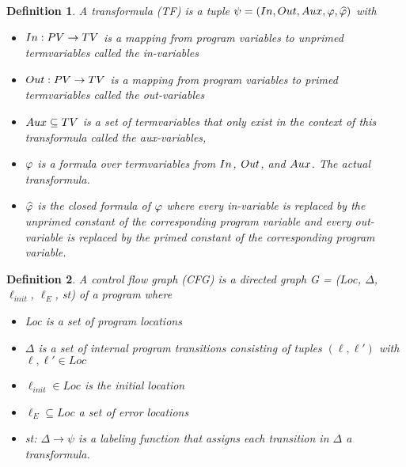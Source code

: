 \documentclass{article}
\newtheorem{mydef}{Definition}
\begin{document}
    \begin{mydef}
        A transformula (TF) is a tuple $\psi = (In, Out, Aux, \varphi, \widehat{\varphi})$ with 
        \begin{itemize}
          \item $In : PV \rightarrow TV$ is a mapping from program variables to unprimed termvariables called the in-variables
          \item $Out : PV \rightarrow TV$ is a mapping from program variables to primed termvariables called the out-variables
          \item $Aux \subseteq TV$ is a set of termvariables that only exist in the context of this transformula called the aux-variables,
          \item $\varphi$ is a formula over termvariables from $In$, $Out$, and $Aux$. The actual transformula.
          \item $\widehat{\varphi}$ is the closed formula of $\varphi$ where every in-variable is replaced by the unprimed constant of the corresponding program variable and every out-variable is replaced by the primed constant of the corresponding program variable.
        \end{itemize}
    \end{mydef}

	\begin{mydef}
		A control flow graph (CFG) is a directed graph G = ($Loc$, $\Delta$, $\ell_{init}$, $\ell_E$, st) of a program where
		\begin{itemize}
			\item  Loc is a set of program locations
			\item $\Delta$ is a set of internal program transitions consisting of tuples $(\ell, \ell')$ with $\ell, \ell' \in Loc$
			\item $\ell_{init} \in Loc$ is the initial location
			\item $\ell_E \subseteq Loc$ a set of error locations
			\item st: $\Delta \rightarrow \psi$ is a labeling function that assigns each transition in $\Delta$ a transformula.
		\end{itemize}
	\end{mydef} \noindent
	 \bigskip
\end{document}
